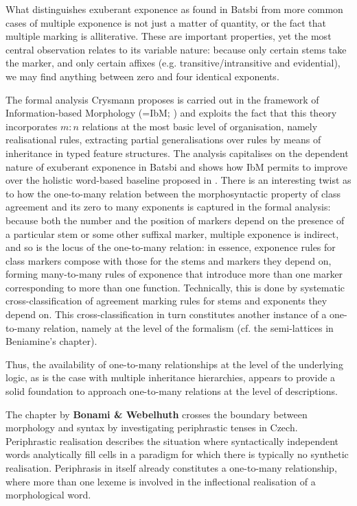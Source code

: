 \documentclass[output=paper]{langscibook}
\begin{document}
What distinguishes exuberant exponence as found in Batsbi from more
common cases of multiple exponence is not just a matter of quantity, or
the fact that multiple marking is alliterative. These are important
properties, yet the most central observation relates to its variable
nature: because only certain stems take the marker, and only certain
affixes (e.g. transitive/intransitive and evidential), we may find
anything between zero and four identical exponents.

The formal analysis Crysmann proposes is carried out in the framework
of Information-based Morphology (=IbM; \citealp{Crysmann:Bonami:2016}) and
exploits the fact that this theory incorporates $m:n$ relations at the
most basic level of organisation, namely realisational rules,
extracting partial generalisations over rules by means of inheritance
in typed feature structures. The analysis capitalises on the dependent
nature of exuberant exponence in Batsbi and shows how IbM permits to
improve over the holistic word-based baseline proposed in
\citet{Harris09}. There is an interesting twist as to how the
one-to-many relation between the morphosyntactic property of class
agreement and its zero to many exponents is captured in the formal
analysis: because both the number and the position of markers depend
on the presence of a particular stem or some other suffixal marker,
multiple exponence is indirect, and so is the locus of the one-to-many
relation: in essence, exponence rules for class markers compose with
those for the stems and markers they depend on, forming many-to-many
rules of exponence that introduce more than one marker corresponding
to more than one function. Technically, this is done by systematic
cross-classification of agreement marking rules for stems and
exponents they depend on. This cross-classification in turn
constitutes another instance of a one-to-many relation, namely at the
level of the formalism (cf. the semi-lattices in Beniamine's chapter).

Thus, the availability of one-to-many relationships at the level of
the underlying logic, as is the case with multiple inheritance
hierarchies, appears to provide a solid foundation to approach
one-to-many relations at the level of descriptions.

\medskip
The chapter by \textbf{Bonami \& Webelhuth} crosses the boundary
between morphology and syntax by investigating periphrastic tenses in
Czech. Periphrastic realisation describes the situation where
syntactically independent words analytically fill cells in a paradigm
for which there is typically no synthetic realisation. Periphrasis
in itself already constitutes a one-to-many relationship, where more
than one lexeme is involved in the inflectional realisation of a
morphological word.
\end{document}
